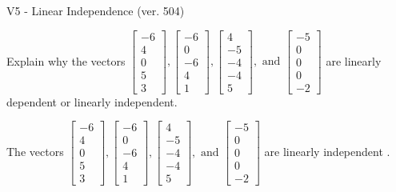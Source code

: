 \begin{exercise}
  \begin{exerciseTitle}V5 - Linear Independence (ver. 504)\end{exerciseTitle}
  \begin{exerciseStatement}
    Explain why the vectors \(\left[\begin{array}{r}
-6 \\
4 \\
0 \\
5 \\
3
\end{array}\right] , \left[\begin{array}{r}
-6 \\
0 \\
-6 \\
4 \\
1
\end{array}\right] , \left[\begin{array}{r}
4 \\
-5 \\
-4 \\
-4 \\
5
\end{array}\right] , \text{ and } \left[\begin{array}{r}
-5 \\
0 \\
0 \\
0 \\
-2
\end{array}\right]\) are linearly dependent or linearly independent.	


  \end{exerciseStatement}
  \begin{exerciseAnswer}
   The vectors \(\left[\begin{array}{r}
-6 \\
4 \\
0 \\
5 \\
3
\end{array}\right] , \left[\begin{array}{r}
-6 \\
0 \\
-6 \\
4 \\
1
\end{array}\right] , \left[\begin{array}{r}
4 \\
-5 \\
-4 \\
-4 \\
5
\end{array}\right] , \text{ and } \left[\begin{array}{r}
-5 \\
0 \\
0 \\
0 \\
-2
\end{array}\right]\) are 
  	 linearly independent  .
  


  \end{exerciseAnswer}
\end{exercise}